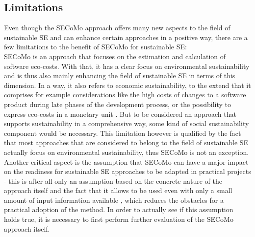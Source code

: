 \documentclass[oribibl]{llncs}
\begin{document}



\subsection{Limitations} %
Even though the SECoMo approach offers many new aspects to the field of sustainable SE and can enhance certain approaches in a positive way, there are a few limitations to the benefit of SECoMo for sustainable SE:\\ %
SECoMo is an approach that focuses on the estimation and calculation of software eco-costs. With that, it has a clear focus on environmental sustainability and is thus also mainly enhancing the field of sustainable SE in terms of this dimension. In a way, it also refers to economic sustainability, to the extend that it comprises for example considerations like the high costs of changes to a software product during late phases of the development process, or the possibility to express eco-costs in a monetary unit \cite{schulze_cost_2016}. %
But to be considered an approach that supports sustainability in a comprehensive way, some kind of social sustainability component would be necessary. %
This limitation however is qualified %
by the fact that most approaches that are considered to belong to the field of sustainable SE actually focus on environmental sustainability, thus SECoMo is not an exception.\\
Another critical aspect is the assumption that SECoMo can have a major impact on the readiness for sustainable SE approaches to be adapted in practical projects - this is after all only an assumption based on the concrete nature of the approach itself and the fact that it allows to be used even with only a small amount of input information available \cite{schulze_cost_2016}, which reduces the obstacles for a practical adoption of the method. In order to actually see if this assumption holds true, it is necessary to first perform further evaluation of the SECoMo approach itself.
\end{document}
